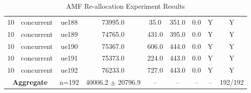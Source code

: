\begin{table}[ht]
\begin{tabular}{|c|c|c|c|c|c|c|c|c|}
10 & concurrent & ue188 & 73995.0 & 35.0 & 351.0 & 0.0 & Y & Y \\
10 & concurrent & ue189 & 74765.0 & 431.0 & 395.0 & 0.0 & Y & Y \\
10 & concurrent & ue190 & 75367.0 & 606.0 & 444.0 & 0.0 & Y & Y \\
10 & concurrent & ue191 & 75373.0 & 224.0 & 443.0 & 0.0 & Y & Y \\
10 & concurrent & ue192 & 76233.0 & 727.0 & 443.0 & 0.0 & Y & Y \\
\multicolumn{2}{|c|}{\textbf{Aggregate}} & n=192 & 40006.2 $\pm$ 20796.9 & -- & -- & -- & -- & 192/192 \\
\hline
\end{tabular}
\caption{AMF Re-allocation Experiment Results}
\label{tab:amf_realloc}
\end{table}

